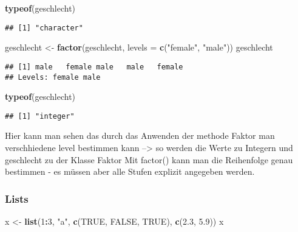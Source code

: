 \documentclass[
]{article}
\newenvironment{Shaded}{\begin{snugshade}}{\end{snugshade}}
\newcommand{\AttributeTok}[1]{\textcolor[rgb]{0.13,0.29,0.53}{#1}}
\newcommand{\ConstantTok}[1]{\textcolor[rgb]{0.56,0.35,0.01}{#1}}
\newcommand{\DecValTok}[1]{\textcolor[rgb]{0.00,0.00,0.81}{#1}}
\newcommand{\FloatTok}[1]{\textcolor[rgb]{0.00,0.00,0.81}{#1}}
\newcommand{\FunctionTok}[1]{\textcolor[rgb]{0.13,0.29,0.53}{\textbf{#1}}}
\newcommand{\NormalTok}[1]{#1}
\newcommand{\OtherTok}[1]{\textcolor[rgb]{0.56,0.35,0.01}{#1}}
\newcommand{\SpecialCharTok}[1]{\textcolor[rgb]{0.81,0.36,0.00}{\textbf{#1}}}
\newcommand{\StringTok}[1]{\textcolor[rgb]{0.31,0.60,0.02}{#1}}
\begin{document}
\begin{Shaded}
\begin{Highlighting}[]
\FunctionTok{typeof}\NormalTok{(geschlecht)}
\end{Highlighting}
\end{Shaded}

\begin{verbatim}
## [1] "character"
\end{verbatim}

\begin{Shaded}
\begin{Highlighting}[]
\NormalTok{geschlecht }\OtherTok{\textless{}{-}} \FunctionTok{factor}\NormalTok{(geschlecht, }\AttributeTok{levels =} \FunctionTok{c}\NormalTok{(}\StringTok{"female"}\NormalTok{, }\StringTok{"male"}\NormalTok{))}
\NormalTok{geschlecht}
\end{Highlighting}
\end{Shaded}

\begin{verbatim}
## [1] male   female male   male   female
## Levels: female male
\end{verbatim}

\begin{Shaded}
\begin{Highlighting}[]
\FunctionTok{typeof}\NormalTok{(geschlecht)}
\end{Highlighting}
\end{Shaded}

\begin{verbatim}
## [1] "integer"
\end{verbatim}

Hier kann man sehen das durch das Anwenden der methode Faktor man
verschhiedene level bestimmen kann --\textgreater{} so werden die Werte
zu Integern und geschlecht zu der Klasse Faktor Mit factor() kann man
die Reihenfolge genau bestimmen - es müssen aber alle Stufen explizit
angegeben werden.

\hypertarget{lists}{%
\subsubsection{Lists}\label{lists}}

\begin{Shaded}
\begin{Highlighting}[]
\NormalTok{x }\OtherTok{\textless{}{-}} \FunctionTok{list}\NormalTok{(}\DecValTok{1}\SpecialCharTok{:}\DecValTok{3}\NormalTok{, }\StringTok{"a"}\NormalTok{, }\FunctionTok{c}\NormalTok{(}\ConstantTok{TRUE}\NormalTok{, }\ConstantTok{FALSE}\NormalTok{, }\ConstantTok{TRUE}\NormalTok{), }\FunctionTok{c}\NormalTok{(}\FloatTok{2.3}\NormalTok{, }\FloatTok{5.9}\NormalTok{))}
\NormalTok{x}
\end{Highlighting}
\end{Shaded}
\end{document}
